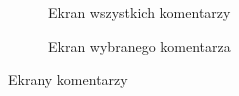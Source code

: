 \begin{figure}[ht!]
\begin{subfigure}[t]{0.32\textwidth}
    \caption{Ekran wszystkich komentarzy}
  \end{subfigure}
  \begin{subfigure}[t]{0.32\textwidth}
    \centering
    \caption{Ekran wybranego komentarza}
  \end{subfigure}
  \caption{Ekrany komentarzy}
  \label{fig:ratings}
\end{figure}
